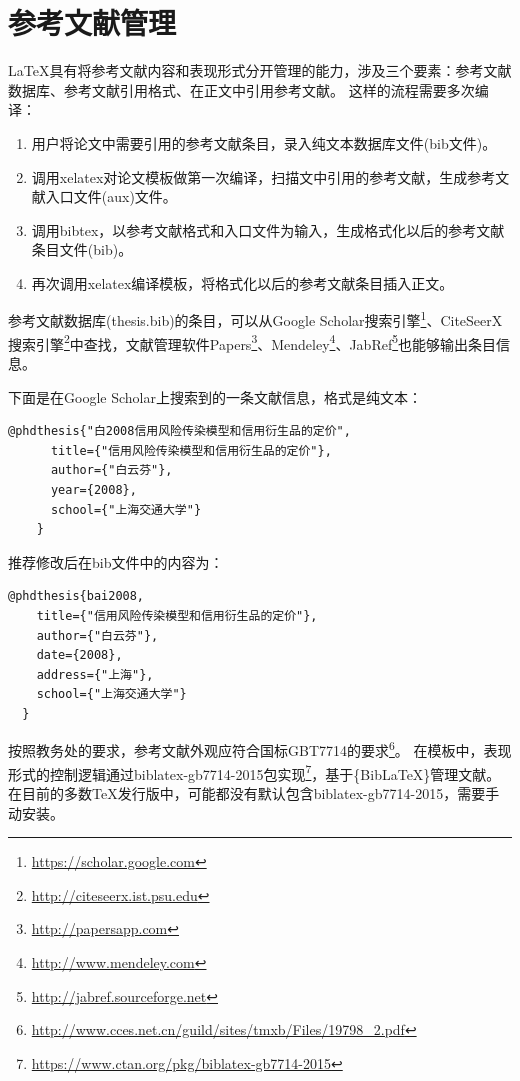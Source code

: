 \documentclass[doctor,openright,twoside]{sjtuthesis}
\theoremstyle{plain}
\theoremstyle{definition}
\theoremstyle{remark}
\theoremstyle{ocrenumbox}
\theoremstyle{plain}
\begin{document}
\section{参考文献管理}

\LaTeX 具有将参考文献内容和表现形式分开管理的能力，涉及三个要素：参考文献数据库、参考文献引用格式、在正文中引用参考文献。
这样的流程需要多次编译：

\begin{enumerate}[noitemsep,topsep=0pt,parsep=0pt,partopsep=0pt]
    \item 用户将论文中需要引用的参考文献条目，录入纯文本数据库文件(bib文件)。
    \item 调用xelatex对论文模板做第一次编译，扫描文中引用的参考文献，生成参考文献入口文件(aux)文件。
    \item 调用bibtex，以参考文献格式和入口文件为输入，生成格式化以后的参考文献条目文件(bib)。
    \item 再次调用xelatex编译模板，将格式化以后的参考文献条目插入正文。
\end{enumerate}

参考文献数据库(thesis.bib)的条目，可以从Google
Scholar搜索引擎\footnote{\url{https://scholar.google.com}}、CiteSeerX搜索引擎\footnote{\url{http://citeseerx.ist.psu.edu}}中查找，文献管理软件Papers\footnote{\url{http://papersapp.com}}、Mendeley\footnote{\url{http://www.mendeley.com}}、JabRef\footnote{\url{http://jabref.sourceforge.net}}也能够输出条目信息。

下面是在Google Scholar上搜索到的一条文献信息，格式是纯文本：

\begin{lstlisting}[caption={从Google Scholar找到的参考文献条目}, label=googlescholar, escapeinside="", numbers=none]
    @phdthesis{"白2008信用风险传染模型和信用衍生品的定价",
      title={"信用风险传染模型和信用衍生品的定价"},
      author={"白云芬"},
      year={2008},
      school={"上海交通大学"}
    }
\end{lstlisting}

推荐修改后在bib文件中的内容为：

\begin{lstlisting}[caption={修改后的参考文献条目}, label=itemok, escapeinside="", numbers=none]
  @phdthesis{bai2008,
    title={"信用风险传染模型和信用衍生品的定价"},
    author={"白云芬"},
    date={2008},
    address={"上海"},
    school={"上海交通大学"}
  }
\end{lstlisting}

按照教务处的要求，参考文献外观应符合国标GBT7714的要求\footnote{\url{http://www.cces.net.cn/guild/sites/tmxb/Files/19798_2.pdf}}。
在模板中，表现形式的控制逻辑通过biblatex-gb7714-2015包实现\footnote{\url{https://www.ctan.org/pkg/biblatex-gb7714-2015}}，基于\{Bib\LaTeX\}管理文献。在目前的多数TeX发行版中，可能都没有默认包含biblatex-gb7714-2015，需要手动安装。
\end{document}
